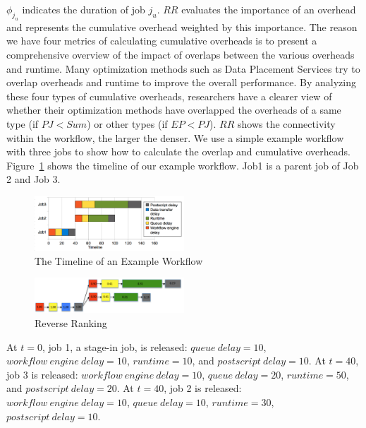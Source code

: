 $\phi_{j_u}$ indicates the duration of job $j_u$.  $RR$ evaluates the importance of an overhead and represents the cumulative overhead weighted by this importance. 
The reason we have four metrics of calculating cumulative overheads is to present a comprehensive overview of the impact of overlaps between the various overheads and runtime. Many optimization methods such as Data Placement Services \cite{Amer2012} try to overlap overheads and runtime to improve the overall performance. By analyzing these four types of cumulative overheads, researchers have a clearer view of whether their optimization methods have overlapped the overheads of a same type (if $PJ < Sum$) or other types (if $EP < PJ$). $RR$ shows the connectivity within the workflow, the larger the denser. 
We use a simple example workflow with three jobs to show how to calculate the overlap and cumulative overheads. Figure~\ref{fig:model_overhead_timeline} shows the timeline of our example workflow. Job1 is a parent job of Job 2 and Job 3.

\begin{figure}[h!]
	\centering
    \includegraphics[width=0.5\textwidth]{figures/model/overhead_timeline.pdf}
    \caption{The Timeline of an Example Workflow}
    \label{fig:model_overhead_timeline}
\end{figure}


\begin{figure}[h!]
	\centering
    \includegraphics[width=0.5\textwidth]{figures/model/rr.pdf}
    \caption{Reverse Ranking}
    \label{fig:model_rr}
\end{figure}

At $t=0$, job 1, a stage-in job, is released: $queue~delay = 10$, $workflow~engine~delay = 10$, $runtime = 10$, and $postscript~delay = 10$.
At $t=40$, job 3 is released: $workflow~engine~delay = 10$, $queue~delay = 20$, $runtime = 50$, and $postscript~delay = 20$.
At $t=40$, job 2 is released: $workflow~engine~delay = 10$, $queue~delay = 10$, $runtime = 30$, $postscript~delay = 10$. 

